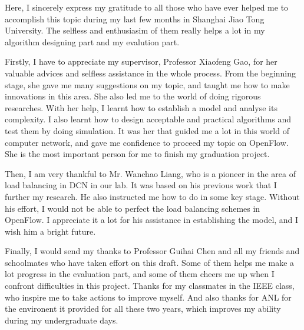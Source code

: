 
\begin{thanks}

Here, I sincerely express my gratitude to all those who have ever helped me to accomplish this topic during my last few months in Shanghai Jiao Tong University. The selfless and enthusiasim of them really helps a lot in my algorithm designing part and my evalution part. 

Firstly, I have to appreciate my supervisor, Professor Xiaofeng Gao, for her valuable advices and selfless assistance in the whole process. From the beginning stage, she gave me many suggestions on my topic, and taught me how to make innovations in this area. She also led me to the world of doing rigorous researches. With her help, I learnt how to establish a model and analyse its complexity. I also learnt how to design acceptable and practical algorithms and test them by doing simulation. It was her that guided me a lot in this world of computer network, and gave me confidence to proceed my topic on OpenFlow. She is the most important person for me to finish my graduation project.

Then, I am very thankful to Mr. Wanchao Liang, who is a pioneer in the area of load balancing in DCN in our lab. It was based on his previous work that I further my research. He also instructed me how to do in some key stage. Without his effort, I would not be able to perfect the load balancing schemes in OpenFlow. I appreciate it a lot for his assistance in establishing the model, and I wish him a bright future.

Finally, I would send my thanks to Professor Guihai Chen and all my friends and schoolmates who have taken effort on this draft. Some of them helps me make a lot progress in the evaluation part, and some of them cheers me up when I confront difficulties in this project. Thanks for my classmates in the IEEE class, who inspire me to take actions to improve myself. And also thanks for ANL for the environent it provided for all these two years, which improves my ability during my undergraduate days.

\end{thanks}


